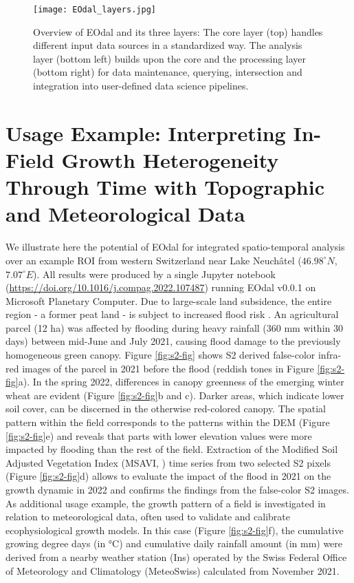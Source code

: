 \begin{figure}[H]
    \centering
    \texttt{[image: EOdal\_layers.jpg]}
    \caption{Overview of EOdal and its three layers: The core layer (top) handles different input data sources in a standardized way. The analysis layer (bottom left) builds upon the core and the processing layer (bottom right) for data maintenance, querying, intersection and integration into user-defined data science pipelines.}
    \label{fig:overview}
\end{figure}

\section{Usage Example: Interpreting In-Field Growth Heterogeneity Through Time with Topographic and Meteorological Data}
\label{sec:reprod_example}
We illustrate here the potential of EOdal for integrated spatio-temporal analysis over an example ROI from western Switzerland near Lake Neuchâtel ($46.98^\circ N$, $7.07^\circ E$). All results were produced by a single Jupyter notebook (\url{https://doi.org/10.1016/j.compag.2022.107487}) running \gls{EOdal} v0.0.1 on Microsoft Planetary Computer. Due to large-scale land subsidence, the entire region - a former peat land - is subject to increased flood risk \citep{egli_landschaftsdynamik_2020}. An agricultural parcel (12 ha) was affected by flooding during heavy rainfall (360 mm within 30 days) between mid-June and July 2021, causing flood damage to the previously homogeneous green canopy. Figure \ref{fig:s2-fig} shows \gls{S2} derived false-color infra-red images of the parcel in 2021 before the flood (reddish tones in Figure \ref{fig:s2-fig}a). In the spring 2022, differences in canopy greenness of the emerging winter wheat are evident (Figure \ref{fig:s2-fig}b and c). Darker areas, which indicate lower soil cover, can be discerned in the otherwise red-colored canopy. The spatial pattern within the field corresponds to the patterns within the DEM (Figure \ref{fig:s2-fig}e) and reveals that parts with lower elevation values were more impacted by flooding than the rest of the field. Extraction of the Modified Soil Adjusted Vegetation Index (MSAVI, \cite{qi_modified_1994}) time series from two selected S2 pixels (Figure \ref{fig:s2-fig}d) allows to evaluate the impact of the flood in 2021 on the growth dynamic in 2022 and confirms the findings from the false-color S2 images.
As additional usage example, the growth pattern of a field is investigated in relation to meteorological data, often used to validate and calibrate ecophysiological growth models. In this case (Figure \ref{fig:s2-fig}f), the cumulative growing degree days (in °C) and cumulative daily rainfall amount (in mm) were derived from a nearby weather station (Ins) operated by the Swiss Federal Office of Meteorology and Climatology (MeteoSwiss) calculated from November  2021.

